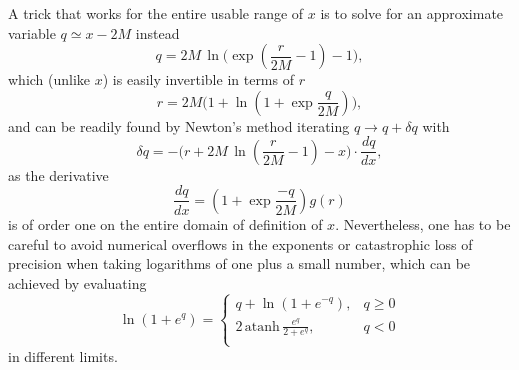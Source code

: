 \documentclass[aps,prd,reprint,twocolumn,groupedaddress]{revtex4-1}
\begin{document}
A trick that works for the entire usable range of $x$ is to solve for an approximate variable $q \simeq x - 2M$ instead \begin{equation}
  q = 2M\, \ln\Bigg(\exp\left(\frac{r}{2M} - 1\right) - 1\Bigg),
\end{equation}
which (unlike $x$) is easily invertible in terms of $r$
\begin{equation}
  r = 2M \Bigg(1 + \ln\left(1+\exp\frac{q}{2M}\right)\Bigg),
\end{equation}
and can be readily found by Newton's method iterating $q \rightarrow q + \delta q$ with
\begin{equation}
  \delta q = -\Bigg(r + 2M\,\ln\left(\frac{r}{2M} - 1\right) - x\Bigg) \cdot \frac{dq}{dx},
\end{equation}
as the derivative
\begin{equation}
  \frac{dq}{dx} = \left(1+\exp\frac{-q}{2M}\right) g(r)
\end{equation}
is of order one on the entire domain of definition of $x$. Nevertheless, one has to be careful to avoid numerical overflows in the exponents or catastrophic loss of precision when taking logarithms of one plus a small number, which can be achieved by evaluating 
\begin{equation}
  \ln\left(1+e^q\right) = \left\{ \begin{array}{rr}
    q + \ln\left(1 + e^{-q}\right),& q \ge 0\\
    2\, \text{atanh}\, {\displaystyle\frac{e^q}{2+e^q}},& q < 0\\
  \end{array} \right.
\end{equation}
in different limits.


\end{document}
